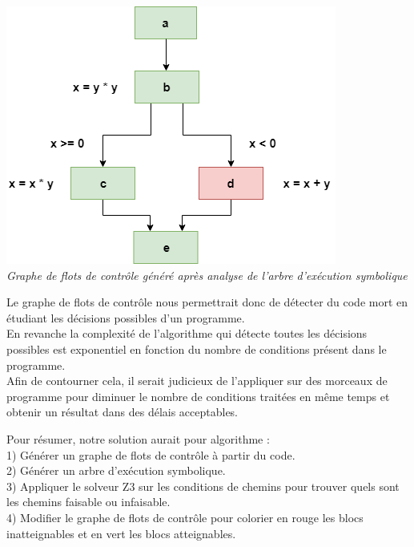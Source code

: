 \documentclass[a4paper,twoside,12pt,openright]{report}
\begin{document}
\begin{center}
\includegraphics[scale=0.8]{Image/ExempleGraphe2.png}\\
\itshape{Graphe de flots de contrôle généré après analyse de l'arbre d'exécution symbolique}
\end{center}

Le graphe de flots de contrôle nous permettrait donc de détecter du code mort en étudiant les décisions possibles d'un programme.\\
En revanche la complexité de l'algorithme qui détecte toutes les décisions possibles est exponentiel en fonction du nombre de conditions présent dans le programme.\\
Afin de contourner cela, il serait judicieux de l'appliquer sur des morceaux de programme pour diminuer le nombre de conditions traitées en même temps et obtenir un résultat dans des délais acceptables.\\

\newpage

Pour résumer, notre solution aurait pour algorithme :\\

1) Générer un graphe de flots de contrôle à partir du code.\\

2) Générer un arbre d'exécution symbolique.\\

3) Appliquer le solveur Z3 sur les conditions de chemins pour trouver quels sont les chemins faisable ou infaisable.\\

4) Modifier le graphe de flots de contrôle pour colorier en rouge les blocs inatteignables et en vert les blocs atteignables.\\
\end{document}
